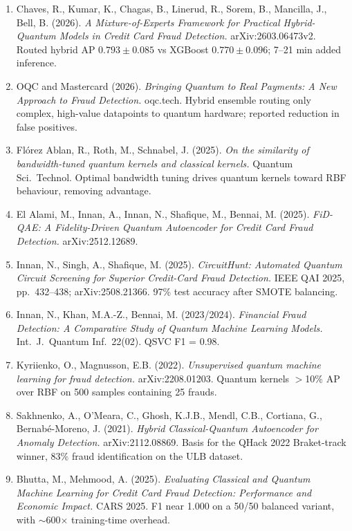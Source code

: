 \documentclass[10pt,a4paper]{article}
\begin{document}
\small
\begin{enumerate}[leftmargin=20pt,itemsep=1.5pt]
\item Chaves, R., Kumar, K., Chagas, B., Linerud, R., Sorem, B., Mancilla, J., Bell, B. (2026). \emph{A Mixture-of-Experts Framework for Practical Hybrid-Quantum Models in Credit Card Fraud Detection.} arXiv:2603.06473v2. Routed hybrid AP $0.793\pm0.085$ vs XGBoost $0.770\pm0.096$; 7--21 min added inference.
\item OQC and Mastercard (2026). \emph{Bringing Quantum to Real Payments: A New Approach to Fraud Detection.} oqc.tech. Hybrid ensemble routing only complex, high-value datapoints to quantum hardware; reported reduction in false positives.
\item Flórez Ablan, R., Roth, M., Schnabel, J. (2025). \emph{On the similarity of bandwidth-tuned quantum kernels and classical kernels.} Quantum Sci.\ Technol. Optimal bandwidth tuning drives quantum kernels toward RBF behaviour, removing advantage.
\item El Alami, M., Innan, A., Innan, N., Shafique, M., Bennai, M. (2025). \emph{FiD-QAE: A Fidelity-Driven Quantum Autoencoder for Credit Card Fraud Detection.} arXiv:2512.12689.
\item Innan, N., Singh, A., Shafique, M. (2025). \emph{CircuitHunt: Automated Quantum Circuit Screening for Superior Credit-Card Fraud Detection.} IEEE QAI 2025, pp.\ 432--438; arXiv:2508.21366. 97\% test accuracy after SMOTE balancing.
\item Innan, N., Khan, M.A.-Z., Bennai, M. (2023/2024). \emph{Financial Fraud Detection: A Comparative Study of Quantum Machine Learning Models.} Int.\ J.\ Quantum Inf.\ 22(02). QSVC F1 = 0.98.
\item Kyriienko, O., Magnusson, E.B. (2022). \emph{Unsupervised quantum machine learning for fraud detection.} arXiv:2208.01203. Quantum kernels $>$10\% AP over RBF on 500 samples containing 25 frauds.
\item Sakhnenko, A., O'Meara, C., Ghosh, K.J.B., Mendl, C.B., Cortiana, G., Bernabé-Moreno, J. (2021). \emph{Hybrid Classical-Quantum Autoencoder for Anomaly Detection.} arXiv:2112.08869. Basis for the QHack 2022 Braket-track winner, 83\% fraud identification on the ULB dataset.
\item Bhutta, M., Mehmood, A. (2025). \emph{Evaluating Classical and Quantum Machine Learning for Credit Card Fraud Detection: Performance and Economic Impact.} CARS 2025. F1 near 1.000 on a 50/50 balanced variant, with $\sim$600$\times$ training-time overhead.

\end{enumerate}
\end{document}
